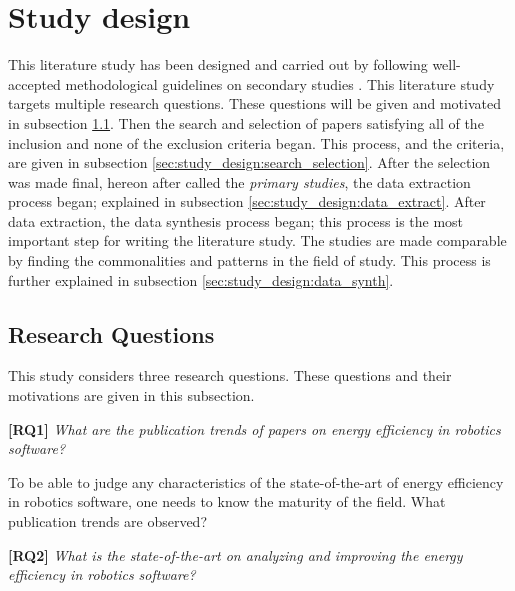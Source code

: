 \section{Study design}
\label{sec:study_design}
This literature study has been designed and carried out by following 
well-accepted methodological guidelines on secondary studies
\cite{petersen2015guidelines_systematic, kitchenham2013systematic_review_guidelines, wohlin2012experimentation}.
This literature study targets multiple research questions. 
These questions will be given and motivated in subsection \ref{sec:study_design:research_questions}.
Then the search and selection of papers satisfying all of the inclusion and none of the exclusion criteria began.
This process, and the criteria, are given in subsection \ref{sec:study_design:search_selection}.
After the selection was made final, hereon after called the \textit{primary studies}, 
the data extraction process began; explained in subsection \ref{sec:study_design:data_extract}. 
After data extraction, the data synthesis process began; this process is the most important step for writing the literature study. 
The studies are made comparable by finding the commonalities and patterns in the field of study. 
This process is further explained in subsection \ref{sec:study_design:data_synth}.


\subsection{Research Questions}
\label{sec:study_design:research_questions}
This study considers three research questions. These questions and their motivations are given in this subsection.

\vspace{2mm}

\textbf{[RQ1]} \textit{What are the publication trends of papers on energy efficiency in robotics software?}

\vspace{2mm}

To be able to judge any characteristics of the state-of-the-art of energy efficiency in robotics software, one needs to know the maturity of the field.
What publication trends are observed?

\vspace{2mm}

\textbf{[RQ2]} \textit{What is the state-of-the-art on analyzing and improving the energy efficiency in robotics software?}

\vspace{2mm}

